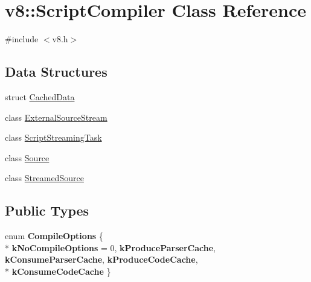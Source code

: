 \hypertarget{classv8_1_1ScriptCompiler}{}\section{v8\+:\+:Script\+Compiler Class Reference}
\label{classv8_1_1ScriptCompiler}


{\ttfamily \#include $<$v8.\+h$>$}

\subsection*{Data Structures}
\begin{DoxyCompactItemize}
\item 
struct \hyperlink{structv8_1_1ScriptCompiler_1_1CachedData}{Cached\+Data}
\item 
class \hyperlink{classv8_1_1ScriptCompiler_1_1ExternalSourceStream}{External\+Source\+Stream}
\item 
class \hyperlink{classv8_1_1ScriptCompiler_1_1ScriptStreamingTask}{Script\+Streaming\+Task}
\item 
class \hyperlink{classv8_1_1ScriptCompiler_1_1Source}{Source}
\item 
class \hyperlink{classv8_1_1ScriptCompiler_1_1StreamedSource}{Streamed\+Source}
\end{DoxyCompactItemize}
\subsection*{Public Types}
\begin{DoxyCompactItemize}
\item 
enum {\bfseries Compile\+Options} \{ \\*
{\bfseries k\+No\+Compile\+Options} = 0, 
{\bfseries k\+Produce\+Parser\+Cache}, 
{\bfseries k\+Consume\+Parser\+Cache}, 
{\bfseries k\+Produce\+Code\+Cache}, 
\\*
{\bfseries k\+Consume\+Code\+Cache}
 \}\hypertarget{classv8_1_1ScriptCompiler_aa6db7774ab5d8793cd88db6b35a71818}{}\label{classv8_1_1ScriptCompiler_aa6db7774ab5d8793cd88db6b35a71818}

\end{DoxyCompactItemize}
